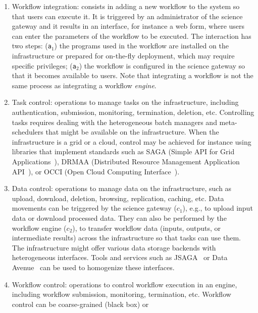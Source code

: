 \documentclass[preprint,3p,twocolumn]{elsarticle}
\newcommand{\correction}[1]{\color{blue}#1\color{black}\xspace}
\begin{document}
\begin{enumerate}[leftmargin=0cm,itemindent=0.65cm,label=\texttt{(\alph*)}]

\item Workflow integration: consists in adding a new workflow to the
  system so that users can execute it. It is triggered by an
  administrator of the science gateway and it results in an interface,
  for instance a web form, where users can enter the parameters of the
  workflow to be executed. The interaction has two steps:
  (\texttt{a$_1$}) the programs used in the workflow are installed on
  the infrastructure or prepared for on-the-fly deployment, which
  may require specific privileges; (\texttt{a$_2$}) the
  workflow is configured in the science gateway so that it becomes
  available to users. Note that integrating a workflow is not the same
  process as integrating a workflow \emph{engine}.
\item Task control: operations to manage tasks on the infrastructure,
  including authentication, submission, monitoring, termination,
  deletion, etc. Controlling tasks requires dealing with the
  heterogeneous batch managers and meta-schedulers that might be
  available on the infrastructure. When the infrastructure is a grid
  or a cloud, control may be achieved for instance using libraries that
  implement standards such as SAGA (Simple API for Grid
  Applications~\cite{goodale2006saga}), DRMAA (Distributed Resource
  Management Application API~\cite{troger2012distributed}), or OCCI
  (Open Cloud Computing Interface~\cite{edmonds2012toward}).
\item Data control: operations to manage data on the infrastructure,
  such as upload, download, deletion, browsing, replication, caching,
  etc. Data movements can be triggered \correction{by} the science
  gateway (\texttt{$c_1$}), \correction{e.g.,} to upload input data or
  download processed data. They can also be performed by the workflow
  engine (\texttt{$c_2$}), to transfer workflow data (inputs, outputs,
  or intermediate results) across the infrastructure so that tasks can
  use them. The infrastructure might offer various data storage
  backends with heterogeneous interfaces.  Tools and services such as
  JSAGA~\cite{reynaud2010uniform} or Data Avenue~\cite{hajnal2014data}
  can be used to homogenize these interfaces.
\item Workflow control: operations to control workflow execution in an
  engine, including workflow submission, monitoring, termination,
  etc. Workflow control can be coarse-grained (black box) or

\end{enumerate}
\end{document}
